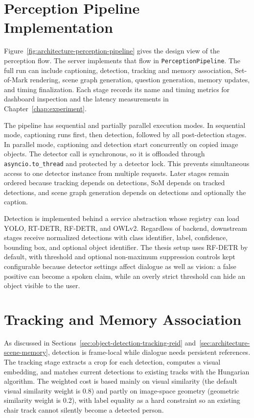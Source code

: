 \section{Perception Pipeline Implementation}\label{sec:server-perception-pipeline}

Figure~\ref{fig:architecture-perception-pipeline} gives the design view of the perception flow.
The server implements that flow in \texttt{PerceptionPipeline}.
The full run can include captioning, detection, tracking and memory association, Set-of-Mark rendering, scene graph generation, question generation, memory updates, and timing finalization.
Each stage records its name and timing metrics for dashboard inspection and the latency measurements in Chapter~\ref{chap:experiment}.

The pipeline has sequential and partially parallel execution modes.
In sequential mode, captioning runs first, then detection, followed by all post-detection stages.
In parallel mode, captioning and detection start concurrently on copied image objects.
The detector call is synchronous, so it is offloaded through \texttt{asyncio.to\_thread} and protected by a detector lock.
This prevents simultaneous access to one detector instance from multiple requests.
Later stages remain ordered because tracking depends on detections, SoM depends on tracked detections, and scene graph generation depends on detections and optionally the caption.

Detection is implemented behind a service abstraction whose registry can load YOLO, RT-DETR, RF-DETR, and OWLv2.
Regardless of backend, downstream stages receive normalized detections with class identifier, label, confidence, bounding box, and optional object identifier.
The thesis setup uses RF-DETR by default, with threshold and optional non-maximum suppression controls kept configurable because detector settings affect dialogue as well as vision: a false positive can become a spoken claim, while an overly strict threshold can hide an object visible to the user.

\section{Tracking and Memory Association}\label{sec:server-tracking-memory}

As discussed in Sections~\ref{sec:object-detection-tracking-reid} and~\ref{sec:architecture-scene-memory}, detection is frame-local while dialogue needs persistent references.
The tracking stage extracts a crop for each detection, computes a visual embedding, and matches current detections to existing tracks with the Hungarian algorithm.
The weighted cost is based mainly on visual similarity (the default visual similarity weight is 0.8) and partly on image-space geometry (geometric similarity weight is 0.2), with label equality as a hard constraint so an existing chair track cannot silently become a detected person.

